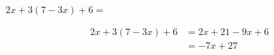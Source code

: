 $2x + 3(7 - 3x) + 6 =$

\begin{solutionbox}{2.5cm}
    \begin{align*}
        2x + 3(7 - 3x) + 6 & =2x + 21 - 9x +6 \\
                           & =-7x+27
    \end{align*}
\end{solutionbox}
